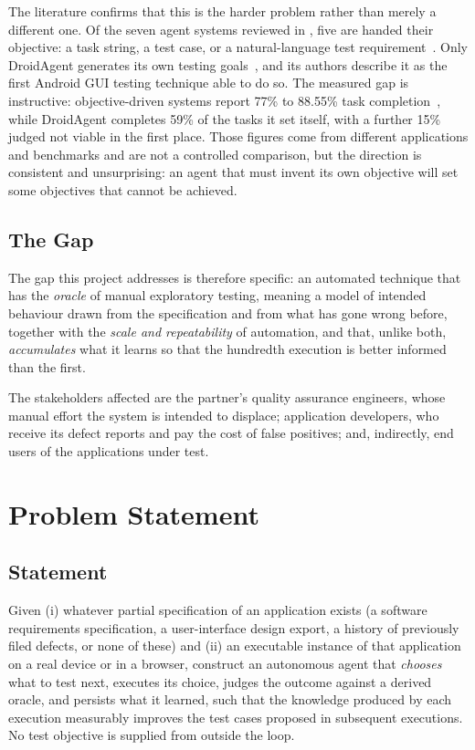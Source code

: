 The literature confirms that this is the harder problem rather than merely a
different one. Of the seven agent systems reviewed in , five
are handed their objective: a task string, a test case, or a natural-language
test requirement~\cite{appagent,appagentx,autodroid,xuatcopilot,auitestagent}.
Only DroidAgent generates its own testing goals~\cite{droidagent}, and its
authors describe it as the first Android GUI testing technique able to do so.
The measured gap is instructive: objective-driven systems report 77\% to
88.55\% task completion~\cite{auitestagent,xuatcopilot}, while DroidAgent
completes 59\% of the tasks it set itself, with a further 15\% judged not
viable in the first place. Those figures come from different applications and
benchmarks and are not a controlled comparison, but the direction is consistent
and unsurprising: an agent that must invent its own objective will set some
objectives that cannot be achieved.

\subsection{The Gap}

The gap this project addresses is therefore specific: an automated technique
that has the \emph{oracle} of manual exploratory testing, meaning a model of
intended behaviour drawn from the specification and from what has gone wrong
before, together with the \emph{scale and repeatability} of automation, and
that, unlike both, \emph{accumulates} what it learns so that the hundredth
execution is better informed than the first.

The stakeholders affected are the partner's quality assurance engineers, whose
manual effort the system is intended to displace; application developers, who
receive its defect reports and pay the cost of false positives; and,
indirectly, end users of the applications under test.

\section{Problem Statement}
\label{sec:problem-statement}

\subsection*{Statement}

Given (i) whatever partial specification of an application exists (a software
requirements specification, a user-interface design export, a history of
previously filed defects, or none of these) and (ii) an executable instance of
that application on a real device or in a browser, construct an autonomous
agent that \emph{chooses} what to test next, executes its choice, judges the
outcome against a derived oracle, and persists what it learned, such that the
knowledge produced by each execution measurably improves the test cases
proposed in subsequent executions. No test objective is supplied from outside
the loop.

